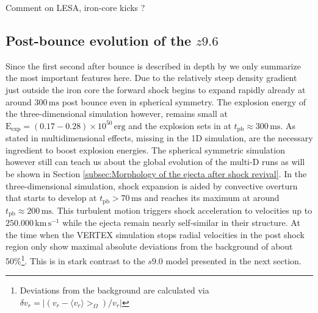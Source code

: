 \documentclass[fleqn,usenatbib]{mnras}
\newcommand{\tpb}{\ensuremath{t_{\text{pb}}}}
\newcommand{\kms}{\ensuremath{\mathrm{km\, s^{-1}}}\xspace}
\newcommand{\vertex}{\textsc{V{\footnotesize ERTEX}}\xspace}
\newcommand{\COM}[1]{{\color{orange}#1}}
\begin{document}
\COM{Comment on LESA, iron-core kicks ?}
\subsection{Post-bounce evolution of the $z9.6$}
Since the first second after bounce is described in depth by \citet{Melson2015a} we only summarize the most important features here. 
Due to the relatively steep density gradient just outside the iron core the forward shock begins to expand rapidly already at around $300\,\text{ms}$ post bounce even in spherical symmetry. The explosion energy of the three-dimensional simulation however, remains small at $\mathrm{E_{exp}}=(0.17-0.28)\times 10^{50} \, \text{erg}$ and the explosion sets in at $\tpb \approx 300\,\text{ms}$. As stated in \cite{Melson2015} multidimensional effects, missing in the 1D simulation, are the necessary ingredient to boost explosion energies. The spherical symmetric simulation however still can teach us about the global evolution of the multi-D runs as will be shown in Section \ref{subsec:Morphology of the ejecta after shock revival}.
In the three-dimensional simulation, shock expansion is aided by convective overturn that starts to develop at $\tpb > 70\,\text{ms} $ and reaches its maximum at around $\tpb \approx 200\,\text{ms}$. This turbulent motion triggers shock acceleration to velocities up to $\mathrm{250.000\,\kms}$ while the ejecta remain nearly self-similar in their structure. 
At the time when the \vertex simulation stops radial velocities in the post shock region only show maximal absolute deviations from the background of about 50\%\footnote{Deviations from the background are calculated via $\delta v_r = | (v_r - \langle v_r \rangle>_{\Omega}) / v_r |$}. This is in stark contrast to the $s9.0$ model presented in the next section. 
\end{document}
